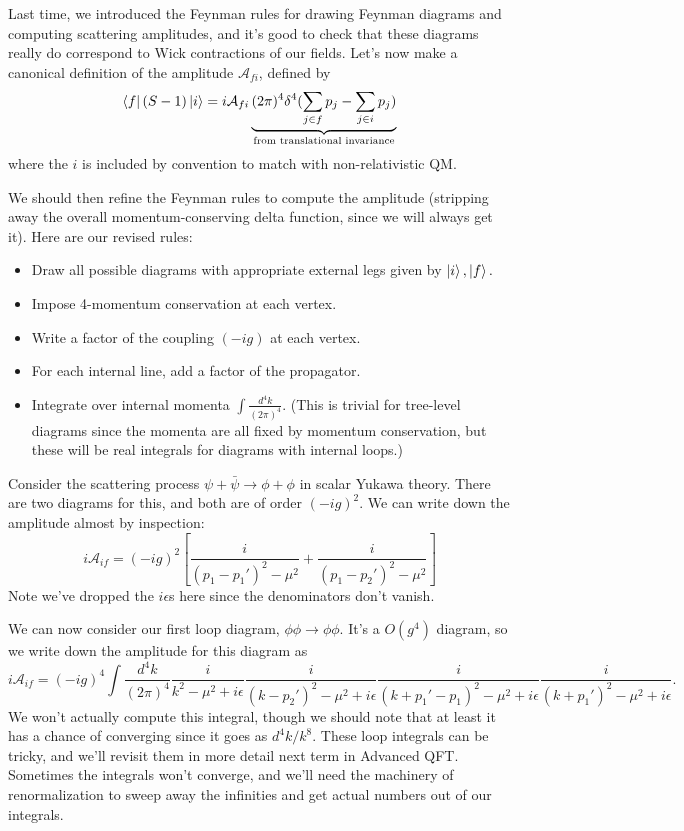 Last time, we introduced the Feynman rules for drawing Feynman diagrams and computing scattering amplitudes, and it's good to check that these diagrams really do correspond to Wick contractions of our fields. Let's now make a canonical definition of the amplitude $\mathcal{A}_{fi}$, defined by
$$\left< f \right|(S-1)\left| i \right>=i\mathcal{A}_{fi} \underbrace{(2\pi)^4 \delta^4(\sum_{j\in f} p_j - \sum_{j\in i} p_j)}_{\text{from translational invariance}}$$
where the $i$ is included by convention to match with non-relativistic QM.

We should then refine the Feynman rules to compute the amplitude (stripping away the overall momentum-conserving delta function, since we will always get it). Here are our revised rules:
\begin{itemize}
    \item Draw all possible diagrams with appropriate external legs given by $\left| i \right>,\left| f \right>.$
    \item Impose 4-momentum conservation at each vertex.
    \item Write a factor of the coupling $(-ig)$ at each vertex.
    \item For each internal line, add a factor of the propagator.
    \item Integrate over internal momenta $\int \frac{d^4k}{(2\pi)^4}.$ (This is trivial for tree-level diagrams since the momenta are all fixed by momentum conservation, but these will be real integrals for diagrams with internal loops.)
\end{itemize}

\begin{exm}%
Consider the scattering process $\psi+\bar \psi \to \phi+\phi$ in scalar Yukawa theory. There are two diagrams for this, and both are of order $(-ig)^2$. We can write down the amplitude almost by inspection:
$$i\mathcal{A}_{if}=(-ig)^2\left[\frac{i}{(p_1-p_1')^2-\mu^2}+\frac{i}{(p_1-p_2')^2-\mu^2}\right]$$
Note we've dropped the $i\epsilon$s here since the denominators don't vanish.
\end{exm}

\begin{exm}%
We can now consider our first loop diagram, $\phi\phi \to \phi\phi.$ It's a $O(g^4)$ diagram, so we write down the amplitude for this diagram as
$$i\mathcal{A}_{if}=(-ig)^4 \int \frac{d^4k}{(2\pi)^4}\frac{i}{k^2-\mu^2+i\epsilon} \frac{i}{(k-p_2')^2-\mu^2 +i\epsilon}\frac{i}{(k+p_1'-p_1)^2-\mu^2+i\epsilon}\frac{i}{(k+p_1')^2-\mu^2+i\epsilon}.$$
We won't actually compute this integral, though we should note that at least it has a chance of converging since it goes as $d^4k/k^8$. These loop integrals can be tricky, and we'll revisit them in more detail next term in Advanced QFT. Sometimes the integrals won't converge, and we'll need the machinery of renormalization to sweep away the infinities and get actual numbers out of our integrals.
\end{exm}

